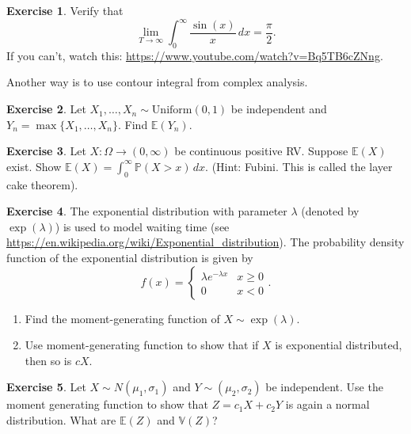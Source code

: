 \documentclass[
  openany]{book}
\theoremstyle{definition}
\theoremstyle{definition}
\theoremstyle{definition}
\newtheorem{exercise}{Exercise}[chapter]
\theoremstyle{definition}
\theoremstyle{remark}
\begin{document}
\begin{exercise}
Verify that
\[\lim_{T \to \infty} \int_0^\infty \frac{\sin(x)}{x} \, dx = \frac{\pi}{2}.\]
If you can't, watch this:
\url{https://www.youtube.com/watch?v=Bq5TB6cZNng}.

Another way is to use contour integral from complex analysis.
\end{exercise}

\begin{exercise}
Let \(X_1, \dots, X_n \sim \mathrm{Uniform}(0,1)\) be independent and \(Y_n = \max\{ X_1, \dots, X_n  \}\).
Find \(\mathbb{E}(Y_n)\).
\end{exercise}

\begin{exercise}
Let \(X:\Omega \to (0,\infty)\) be continuous positive RV. Suppose \(\mathbb{E}(X)\) exist.
Show
\(\mathbb{E}(X) = \int_0^\infty \mathbb{P}(X > x) \, dx\).
(Hint: Fubini. This is called the layer cake theorem).
\end{exercise}

\begin{exercise}

The exponential distribution with parameter \(\lambda\) (denoted by \(\exp(\lambda)\))
is used to model waiting time (see \url{https://en.wikipedia.org/wiki/Exponential_distribution}).
The probability density function of the exponential distribution is given by
\[f(x) = \begin{cases} \lambda e^{-\lambda x} & x\geq 0 \\ 0 & x< 0 \end{cases}.\]

\begin{enumerate}
\def\labelenumi{\arabic{enumi}.}
\item
  Find the moment-generating function of \(X \sim \exp(\lambda)\).
\item
  Use moment-generating function to show that if \(X\) is exponential distributed,
  then so is \(cX\).
\end{enumerate}

\end{exercise}

\begin{exercise}
Let \(X \sim N(\mu_1, \sigma_1)\) and \(Y \sim (\mu_2, \sigma_2)\) be independent.
Use the moment generating function to show that \(Z = c_1 X + c_2 Y\) is again a normal distribution.
What are \(\mathbb{E}(Z)\) and \(\mathbb{V}(Z)\)?
\end{exercise}
\end{document}
